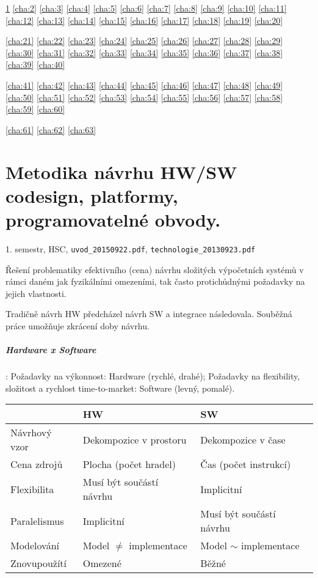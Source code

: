 \documentclass[a4paper, 11pt]{report}
\begin{document}
\ref{cha:1}
\ref{cha:2}
\ref{cha:3}
\ref{cha:4}
\ref{cha:5}
\ref{cha:6}
\ref{cha:7}
\ref{cha:8}
\ref{cha:9}
\ref{cha:10}
\ref{cha:11}
\ref{cha:12}
\ref{cha:13}
\ref{cha:14}
\ref{cha:15}
\ref{cha:16}
\ref{cha:17}
\ref{cha:18}
\ref{cha:19}
\ref{cha:20}

\ref{cha:21}
\ref{cha:22}
\ref{cha:23}
\ref{cha:24}
\ref{cha:25}
\ref{cha:26}
\ref{cha:27}
\ref{cha:28}
\ref{cha:29}
\ref{cha:30}
\ref{cha:31}
\ref{cha:32}
\ref{cha:33}
\ref{cha:34}
\ref{cha:35}
\ref{cha:36}
\ref{cha:37}
\ref{cha:38}
\ref{cha:39}
\ref{cha:40}

\ref{cha:41}
\ref{cha:42}
\ref{cha:43}
\ref{cha:44}
\ref{cha:45}
\ref{cha:46}
\ref{cha:47}
\ref{cha:48}
\ref{cha:49}
\ref{cha:50}
\ref{cha:51}
\ref{cha:52}
\ref{cha:53}
\ref{cha:54}
\ref{cha:55}
\ref{cha:56}
\ref{cha:57}
\ref{cha:58}
\ref{cha:59}
\ref{cha:60}

\ref{cha:61}
\ref{cha:62}
\ref{cha:63}
\newpage

\tableofcontents

\chapter{Metodika návrhu HW/SW codesign, platformy, programovatelné obvody.} \label{cha:1}
1. semestr, HSC, \texttt{uvod\_20150922.pdf}, \texttt{technologie\_20130923.pdf}

Řešení problematiky efektivního (cena) návrhu složitých výpočetních systémů v rámci daném jak fyzikálními omezeními, tak často protichůdnými požadavky na jejich vlastnosti.

Tradičně návrh HW předcházel návrh SW a integrace následovala. Souběžná práce umožňuje zkrácení doby návrhu.

\paragraph{Hardware x Software}: Požadavky na výkonnost: Hardware (rychlé, drahé); Požadavky na flexibility, složitost a rychlost time-to-market: Software (levný, pomalé).

\begin{tabular}{l | l | l |}
					& HW						& SW \\ \hline
	Návrhový vzor	& Dekompozice v prostoru	& Dekompozice v čase \\ \hline
	Cena zdrojů		& Plocha (počet hradel)		& Čas (počet instrukcí) \\ \hline
	Flexibilita		& Musí být součástí návrhu	& Implicitní \\ \hline
	Paralelismus	& Implicitní				& Musí být součástí návrhu \\ \hline
	Modelování		& Model $\not=$ implementace& Model $\sim$ implementace \\ \hline
	Znovupoužítí	& Omezené					& Běžné \\ \hline
\end{tabular}
\end{document}
